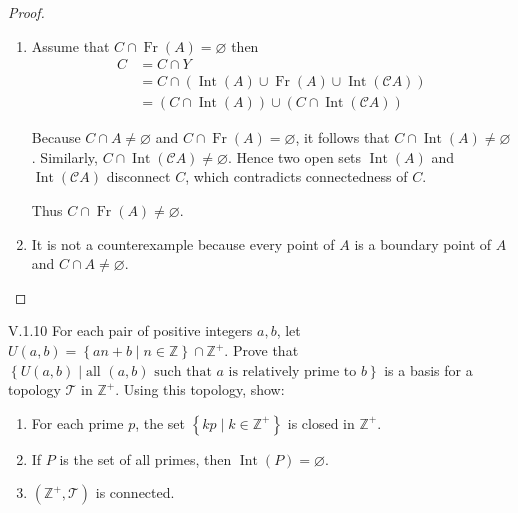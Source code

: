 \begin{proof}
	\begin{enumerate}[label={(\alph*)}]
		\item Assume that \( C \cap \operatorname{Fr}(A) = \varnothing \) then
		      \begingroup
		      \allowdisplaybreaks%
		      \begin{align*}
			      C & = C \cap Y                                                                                       \\
			        & = C \cap (\operatorname{Int}(A) \cup \operatorname{Fr}(A) \cup \operatorname{Int}(\mathscr{C}A)) \\
			        & = (C \cap \operatorname{Int}(A)) \cup (C \cap \operatorname{Int}(\mathscr{C}A))
		      \end{align*}
		      \endgroup

		      Because \( C \cap A \ne \varnothing \) and \( C \cap \operatorname{Fr}(A) = \varnothing \), it follows that \( C \cap \operatorname{Int}(A) \ne \varnothing \). Similarly, \( C \cap \operatorname{Int}(\mathscr{C}A) \ne \varnothing \). Hence two open sets \( \operatorname{Int}(A) \) and \( \operatorname{Int}(\mathscr{C}A) \) disconnect \( C \), which contradicts connectedness of \(C\).

		      Thus \( C \cap \operatorname{Fr}(A) \ne \varnothing \).
		\item It is not a counterexample because every point of \(A\) is a boundary point of \(A\) and \( C \cap A \ne \varnothing \).
	\end{enumerate}
\end{proof}

\begin{problem}{V.1.10}
For each pair of positive integers \( a, b \), let \( U(a, b) = \left\{ an + b \mid n \in \mathbb{Z} \right\} \cap \mathbb{Z}^{+} \). Prove that \( \left\{ U(a, b) \mid \text{all } (a, b) \text{ such that } a \text{ is relatively prime to } b \right\} \) is a basis for a topology \( \mathscr{T} \) in \( \mathbb{Z}^{+} \). Using this topology, show:
\begin{enumerate}[label={(\alph*)}]
	\item For each prime \(p\), the set \( \left\{ kp \mid k \in \mathbb{Z}^{+}  \right\} \) is closed in \( \mathbb{Z}^{+} \).
	\item If \(P\) is the set of all primes, then \( \operatorname{Int}(P) = \varnothing \).
	\item \( (\mathbb{Z}^{+}, \mathscr{T}) \) is connected.
\end{enumerate}
\end{problem}

